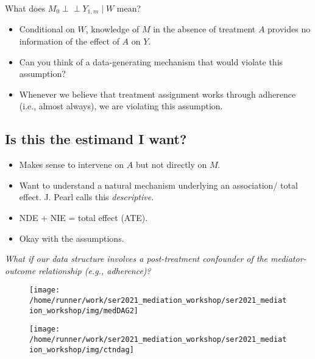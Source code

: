 \documentclass[
  12pt, krantz2,
]{book}
\providecommand{\tightlist}{%
  \setlength{\itemsep}{0pt}\setlength{\parskip}{0pt}}
\theoremstyle{definition}
\theoremstyle{definition}
\theoremstyle{definition}
\newcommand{\indep}{\mbox{$\perp\!\!\!\perp$}}
\newcommand{\1}{\mathbbm{1}}
\begin{document}
What does \(M_0 \indep Y_{1,m} \mid W\) mean?

\begin{itemize}
\tightlist
\item
  Conditional on \(W\), knowledge of \(M\) in the absence of treatment \(A\)
  provides no information of the effect of \(A\) on \(Y\).
\item
  Can you think of a data-generating mechanism that would violate this
  assumption?
\item
  Whenever we believe that treatment assignment works through adherence (i.e.,
  almost always), we are violating this assumption.
\end{itemize}

\hypertarget{is-this-the-estimand-i-want-1}{%
\subsection{Is this the estimand I want?}\label{is-this-the-estimand-i-want-1}}

\begin{itemize}
\tightlist
\item
  Makes sense to intervene on \(A\) but not directly on \(M\).
\item
  Want to understand a natural mechanism underlying an association/ total
  effect. J. Pearl calls this \emph{descriptive}.
\item
  NDE + NIE = total effect (ATE).
\item
  Okay with the assumptions.
\end{itemize}

\emph{What if our data structure involves a post-treatment confounder of the
mediator-outcome relationship (e.g., adherence)?}

\begin{figure}

{\centering \texttt{[image: /home/runner/work/ser2021\_mediation\_workshop/ser2021\_mediation\_workshop/img/medDAG2]} 

}

\end{figure}

\begin{figure}

{\centering \texttt{[image: /home/runner/work/ser2021\_mediation\_workshop/ser2021\_mediation\_workshop/img/ctndag]} 

}

\end{figure}
\end{document}

